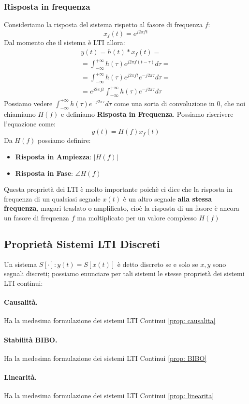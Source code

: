 \subsubsection{Risposta in frequenza}
Consideriamo la risposta del sistema rispetto al fasore di frequenza $f$:
\begin{equation*}
    x_f(t) = e^{j2\pi ft}
\end{equation*}
Dal momento che il sistema è LTI allora:
\begin{align*}
    y(t) = h(t) \ast x_f(t) = \\
    = \int_{-\infty}^{+\infty} h(\tau)e^{j2\pi f(t - \tau)} d\tau =\\
    = \int_{-\infty}^{+\infty} h(\tau)e^{j2\pi ft}e^{-j2\pi\tau} d\tau =\\
    = e^{j2\pi ft} \int_{-\infty}^{+\infty} h(\tau) e^{-j2\pi\tau} d\tau 
\end{align*}
Possiamo vedere $\int_{-\infty}^{+\infty} h(\tau) e^{-j2\pi\tau} d\tau$ come una sorta di convoluzione in 0, che noi chiamiamo $H(f)$ e definiamo \textbf{Risposta in Frequenza}. Possiamo riscrivere l'equazione come:
\begin{equation}
    y(t) = H(f)x_f(t)
\end{equation}
Da $H(f)$ possiamo definire:
\begin{itemize}
    \item \textbf{Risposta in Ampiezza}: $|H(f)|$
    \item \textbf{Risposta in Fase}: $\angle H(f)$
\end{itemize}
Questa proprietà dei LTI è molto importante poichè ci dice che la risposta in frequenza di un qualsiasi segnale $x(t)$ è un altro segnale \textbf{alla stessa frequenza}, magari traslato o amplificato,
cioè la risposta di un fasore è ancora un fasore di frequenza $f$ ma moltiplicato per un valore complesso $H(f)$



\subsection{Proprietà Sistemi LTI Discreti}
Un sistema $S[\cdot]:y(t) = S[x(t)]$ è detto discreto se e solo se $x,y$ sono segnali discreti; possiamo enunciare per tali sistemi le stesse proprietà dei sistemi LTI continui:
\paragraph{Causalità.}
Ha la medesima formulazione dei sistemi LTI Continui \eqref{prop: causalita} 

\paragraph{Stabilità BIBO.}
Ha la medesima formulazione dei sistemi LTI Continui \eqref{prop: BIBO} 

\paragraph{Linearità.}
Ha la medesima formulazione dei sistemi LTI Continui \eqref{prop: linearita} 